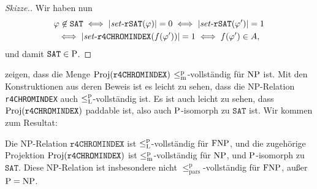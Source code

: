 \begin{proof}[Skizze.]
    Wir haben nun
    \begin{gather*} \phi\not\in\mathtt{SAT} \iff |\fset{}\mathtt{rSAT}(\phi)|=0 \iff |\fset{}\mathtt{rSAT}(\phi')|=1 \\ \iff |\fset{}\mathtt{r4CHROMINDEX}(f(\phi'))|=1 \iff f(\phi') \in A, \end{gather*}
    und damit $\mathtt{SAT}\in\P$.
\end{proof}

\textcite{leven_np_1983} zeigen, dass die Menge $\Proj(\mathtt{r4CHROMINDEX})$ $\leqmp$-vollständig für $\NP$ ist. 
Mit den Konstruktionen aus deren Beweis ist es leicht zu sehen, dass die NP-Relation \texttt{r4CHROMINDEX} auch $\leqlp$-vollständig ist. 
Es ist auch leicht zu sehen, dass $\Proj(\mathtt{r4CHROMINDEX})$ paddable ist, also  auch $\P$-isomorph zu $\mathtt{SAT}$ ist.
Wir kommen zum Resultat:
\begin{corollary}
    Die NP-Relation $\mathtt{r4CHROMINDEX}$ ist $\leqlp$-vollständig für $\FNP$, und die zugehörige Projektion  $\Proj(\mathtt{r4CHROMINDEX})$ ist $\leqmp$-vollständig für $\NP$, und $\P$-isomorph zu $\mathtt{SAT}$.
    Diese NP-Relation ist insbesondere nicht $\leq_\mathrm{pars}^\mathrm p$-vollständig für $\FNP$, außer $\P=\NP$.
\end{corollary}

